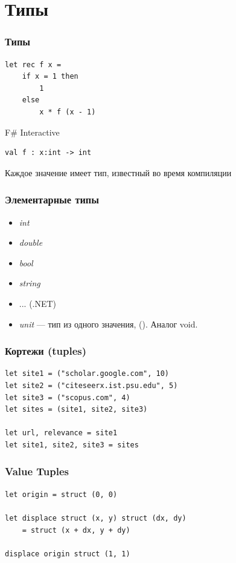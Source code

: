 \documentclass[xetex,mathserif,serif]{beamer}
\begin{document}
	\section{Типы}

	\begin{frame}[fragile]
		\frametitle{Типы}
		\begin{verbatim}
let rec f x =
    if x = 1 then 
        1 
    else 
        x * f (x - 1)
		\end{verbatim}

		\begin{alertblock}{F\# Interactive}
			\begin{verbatim}
val f : x:int -> int
			\end{verbatim}
		\end{alertblock}
		Каждое значение имеет тип, известный во время компиляции
	\end{frame}

	\begin{frame}
		\frametitle{Элементарные типы}
		\begin{itemize}
			\item \textit{int}
			\item \textit{double}
			\item \textit{bool}
			\item \textit{string}
			\item ... (.NET)
			\item \textit{unit} --- тип из одного значения, (). Аналог void.
		\end{itemize}
	\end{frame}
	
	\begin{frame}[fragile]
		\frametitle{Кортежи (tuples)}
		\begin{verbatim}
let site1 = ("scholar.google.com", 10)
let site2 = ("citeseerx.ist.psu.edu", 5)
let site3 = ("scopus.com", 4)
let sites = (site1, site2, site3)

let url, relevance = site1
let site1, site2, site3 = sites
		\end{verbatim}
	\end{frame}

	\begin{frame}[fragile]
		\frametitle{Value Tuples}
		\begin{verbatim}
let origin = struct (0, 0)

let displace struct (x, y) struct (dx, dy)
    = struct (x + dx, y + dy)

displace origin struct (1, 1)
		\end{verbatim}
	\end{frame}
\end{document}

